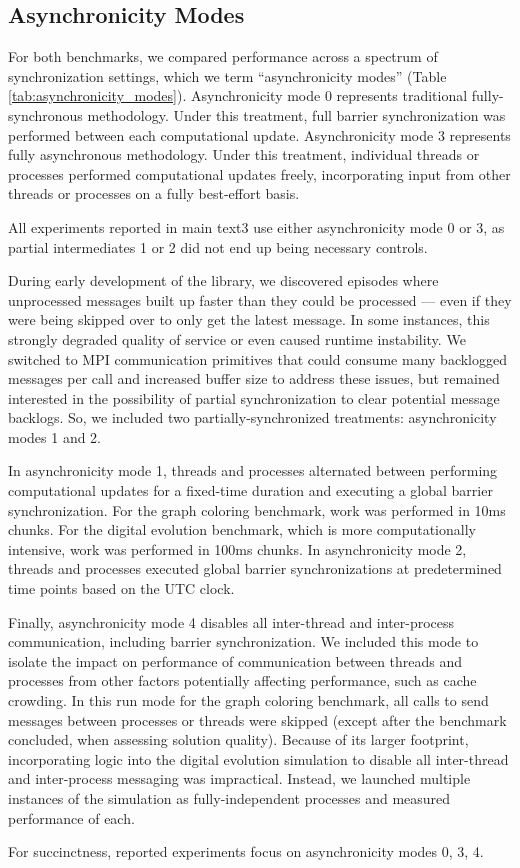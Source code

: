 \subsection{Asynchronicity Modes} \label{sec:asynchronicity_modes}


For both benchmarks, we compared performance across a spectrum of synchronization settings, which we term ``asynchronicity modes'' (Table \ref{tab:asynchronicity_modes}).
Asynchronicity mode 0 represents traditional fully-synchronous methodology.
Under this treatment, full barrier synchronization was performed between each computational update.
Asynchronicity mode 3 represents fully asynchronous methodology.
Under this treatment, individual threads or processes performed computational updates freely, incorporating input from other threads or processes on a fully best-effort basis.

All experiments reported in main text3 use either asynchronicity mode 0 or 3, as partial intermediates 1 or 2 did not end up being necessary controls.

During early development of the library, we discovered episodes where unprocessed messages built up faster than they could be processed --- even if they were being skipped over to only get the latest message.
In some instances, this strongly degraded quality of service or even caused runtime instability.
We switched to MPI communication primitives that could consume many backlogged messages per call and increased buffer size to address these issues, but remained interested in the possibility of partial synchronization to clear potential message backlogs.
So, we included two partially-synchronized treatments: asynchronicity modes 1 and 2.

In asynchronicity mode 1, threads and processes alternated between performing computational updates for a fixed-time duration and executing a global barrier synchronization.
For the graph coloring benchmark, work was performed in 10ms chunks.
For the digital evolution benchmark, which is more computationally intensive, work was performed in 100ms chunks.
In asynchronicity mode 2, threads and processes executed global barrier synchronizations at predetermined time points based on the UTC clock.

Finally, asynchronicity mode 4 disables all inter-thread and inter-process communication, including barrier synchronization.
We included this mode to isolate the impact on performance of communication between threads and processes from other factors potentially affecting performance, such as cache crowding.
In this run mode for the graph coloring benchmark, all calls to send messages between processes or threads were skipped (except after the benchmark concluded, when assessing solution quality).
Because of its larger footprint, incorporating logic into the digital evolution simulation to disable all inter-thread and inter-process messaging was impractical.
Instead, we launched multiple instances of the simulation as fully-independent processes and measured performance of each.

For succinctness, reported experiments focus on asynchronicity modes 0, 3, 4.
